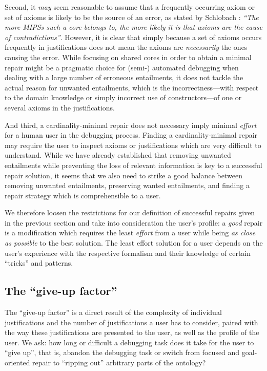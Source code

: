 Second, it \emph{may} seem reasonable to assume that a frequently occurring axiom or set of axioms is likely to be the source of an error, as stated by Schlobach \cite{schlobach05tf}: \emph{\enquote{The more MIPSs such a core belongs to, the more likely it is that axioms are the cause of contradictions}}. However, it is clear that simply because a set of axioms occurs frequently in justifications does not mean the axioms are \emph{necessarily} the ones causing the error. While focusing on shared cores in order to obtain a minimal repair might be a pragmatic choice for (semi-) automated debugging when dealing with a large number of erroneous entailments, it does not tackle the actual reason for unwanted entailments, which is the incorrectness---with respect to the domain knowledge or simply incorrect use of constructors---of one or several axioms in the justifications.

And third, a cardinality-minimal repair does not necessary imply minimal \emph{effort} for a human user in the debugging process. Finding a cardinality-minimal repair may require the user to inspect axioms or justifications which are very difficult to understand. While we have already established that removing unwanted entailments while preventing the loss of relevant information is key to a successful repair solution, it seems that we also need to strike a good balance between removing unwanted entailments, preserving wanted entailments, and finding a repair strategy which is comprehensible to a user.



We therefore loosen the restrictions for our definition of successful repairs given in the previous section and take into consideration the user's profile: a \emph{good} repair is a modification \modif which requires the least \emph{effort} from a user while being \emph{as close as possible} to the best solution. The least effort solution for a user depends on the user's experience with the respective formalism and their knowledge of certain \enquote{tricks} and patterns. 


\subsection{The \enquote{give-up factor}}
The \enquote{give-up factor} is a direct result of the complexity of individual justifications and the number of justifications a user has to consider, paired with the way these justifications are presented to the user, as well as the profile of the user. We ask: how long or difficult a debugging task does it take for the user to \enquote{give up}, that is, abandon the debugging task or switch from focused and goal-oriented repair to \enquote{ripping out} arbitrary parts of the ontology?


